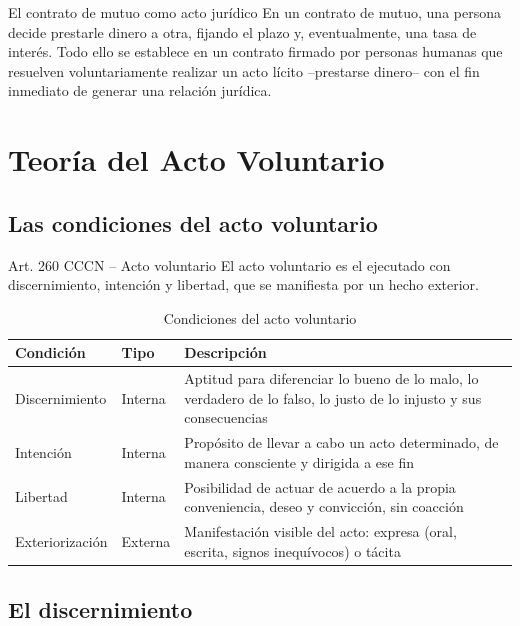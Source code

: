 \documentclass[12pt,oneside]{book}
\begin{document}
\begin{example}{El contrato de mutuo como acto jurídico}
En un contrato de mutuo, una persona decide prestarle dinero a otra, fijando el plazo y, eventualmente, una tasa de interés. Todo ello se establece en un contrato firmado por personas humanas que resuelven voluntariamente realizar un acto lícito --prestarse dinero-- con el fin inmediato de generar una relación jurídica.
\end{example}

\chapter{Teoría del Acto Voluntario}

\section{Las condiciones del acto voluntario}

\begin{definition}{Art. 260 CCCN -- Acto voluntario}
El acto voluntario es el ejecutado con discernimiento, intención y libertad, que se manifiesta por un hecho exterior.
\end{definition}

\begin{table}[H]
\centering
\caption{Condiciones del acto voluntario}
\begin{tabularx}{\textwidth}{l l X}
\toprule
\textbf{Condición} & \textbf{Tipo} & \textbf{Descripción} \\
\midrule
Discernimiento & Interna & Aptitud para diferenciar lo bueno de lo malo, lo verdadero de lo falso, lo justo de lo injusto y sus consecuencias \\
Intención & Interna & Propósito de llevar a cabo un acto determinado, de manera consciente y dirigida a ese fin \\
Libertad & Interna & Posibilidad de actuar de acuerdo a la propia conveniencia, deseo y convicción, sin coacción \\
Exteriorización & Externa & Manifestación visible del acto: expresa (oral, escrita, signos inequívocos) o tácita \\
\bottomrule
\end{tabularx}
\end{table}

\section{El discernimiento}
\end{document}
